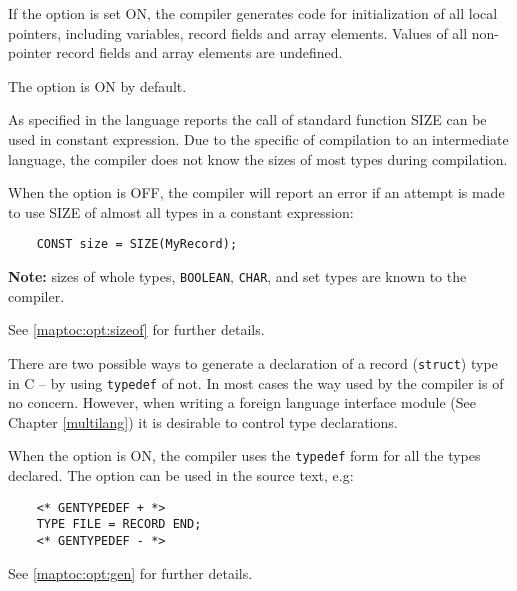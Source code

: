 \begin{description}
        If the option is set ON, the compiler generates code
        for initialization of all local pointers, including
        variables, record fields and
        array elements. Values of all non-pointer
        record fields and array elements are undefined.

        The option is ON by default.
\fi

\ifgenc
{}
        \MLBegin{}\ModeC{}\MLEnd{} \header

        As  specified  in the language  reports the call of standard
        function  SIZE  can be used in constant expression.  Due to the
        specific of compilation to an intermediate language, the compiler
        does not know the sizes of most types during compilation.

        When the option is OFF, the compiler will report an error
        if an attempt is made to use SIZE of almost all types in
        a constant expression:

\verb'    CONST size = SIZE(MyRecord);'

        {\bf Note:} sizes of whole types, \verb'BOOLEAN', \verb'CHAR', and set types
        are known to the compiler.

        See \ref{maptoc:opt:sizeof} for further details.
\fi

\ifgenc
{}
        \MLBegin{}\ModeC{}\MLEnd{} \inline

        There  are two possible ways to generate a declaration of
        a record ({\tt struct}) type in C -- by using {\tt typedef} of
        not. In most cases the way used by the compiler
        is of no concern. However, when writing a foreign
        language interface module (See Chapter \ref{multilang}) it
        is desirable to control type declarations.

        When the option is ON, the compiler uses the {\tt typedef} form
        for all the types declared.
        The option can be used in the source text, e.g:
\begin{verbatim}
    <* GENTYPEDEF + *>
    TYPE FILE = RECORD END;
    <* GENTYPEDEF - *>
\end{verbatim}

        See \ref{maptoc:opt:gen} for further details.

\fi

\ifgencode
\ifdll
{}
        \MLBegin{}\ModeC{}\MLEnd{}


\end{description}
